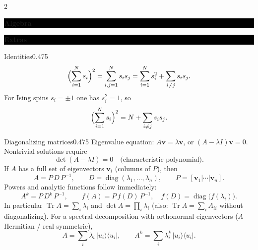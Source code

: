 \documentclass[8pt,a4paper]{extarticle}
\newcommand{\sectionbanner}[1]{%
  \par
  \Needspace{8\baselineskip}%
  \vspace{0.4ex}%
  \noindent
  \colorbox{black}{%
    \parbox{\dimexpr\linewidth-2\fboxsep\relax}{%
      \centering\color{white}\bfseries\footnotesize #1%
    }%
  }%
  \par\vspace{0.3ex}%
  \nopagebreak
}
\newcommand{\avg}[1]{\left\langle #1\right\rangle}
\newcommand{\Tr}{\operatorname{Tr}}
\begin{document}
\begin{multicols*}{2}
\sectionbanner{Algebra}


\sectionbanner{Extras}
\begin{mytikzbox}{Identities}{0.475}
\[
\Bigl(\sum_{i=1}^N s_i\Bigr)^2
=\sum_{i,j=1}^N s_is_j
=\sum_{i=1}^N s_i^2
+\sum_{i\neq j}s_is_j.
\]
For Ising spins $s_i=\pm1$ one has $s_i^2=1$, so
\[
\Bigl(\sum_{i=1}^N s_i\Bigr)^2
=N+\sum_{i\neq j}s_is_j.
\]
\end{mytikzbox}

\begin{mytikzbox}{Diagonalizing matrices}{0.475}
Eigenvalue equation: $A\mathbf v=\lambda\mathbf v$, or
$(A-\lambda I)\mathbf v=0$. Nontrivial solutions require
\[
\det(A-\lambda I)=0
\quad\text{(characteristic polynomial)}.
\]
If $A$ has a full set of eigenvectors $\mathbf v_i$ (columns of $P$), then
\[
A=P\,D\,P^{-1},
\qquad
D=\operatorname{diag}(\lambda_1,\ldots,\lambda_n),
\qquad
P=[\mathbf v_1|\cdots|\mathbf v_n].
\]
Powers and analytic functions follow immediately:
\[
A^k=P\,D^k\,P^{-1},
\qquad
f(A)=P\,f(D)\,P^{-1},
\quad
f(D)=\operatorname{diag}\bigl(f(\lambda_i)\bigr).
\]
In particular $\Tr A=\sum_i\lambda_i$ and $\det A=\prod_i\lambda_i$
(also: $\Tr A=\sum_i A_{ii}$ without diagonalizing).
For a spectral decomposition with orthonormal eigenvectors
($A$ Hermitian / real symmetric),
\[
A=\sum_i\lambda_i\,|u_i\rangle\langle u_i|,
\qquad
A^k=\sum_i\lambda_i^k\,|u_i\rangle\langle u_i|.
\]
\end{mytikzbox}


\end{multicols*}
\end{document}
